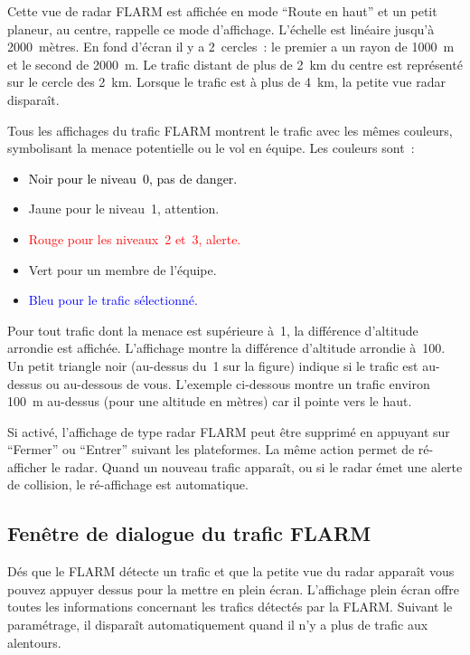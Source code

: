Cette vue de radar FLARM est affichée en mode ``Route en haut'' et un petit planeur, au centre, rappelle ce mode d'affichage. L'échelle est linéaire jusqu'à 2000~mètres. En fond d'écran il y a 2~cercles~: le premier a un rayon de 1000~m et le second de 2000~m. Le trafic distant de plus de 2~km du centre est représenté sur le cercle des 2~km.
Lorsque le trafic est à plus de 4~km, la petite vue radar disparaît.


Tous les affichages du trafic FLARM montrent le trafic avec les mêmes couleurs, symbolisant la menace potentielle ou le vol en équipe. Les couleurs sont~:
\begin{itemize}
\item \textcolor{black} {Noir pour le niveau~0, pas de danger.} 
\item \textcolor{warning} {Jaune pour le niveau~1, attention.}
\item \textcolor{red} {Rouge pour les niveaux~2 et~3, alerte.}
\item \textcolor{teammate} {Vert pour un membre de l'équipe.}
\item \textcolor{blue} {Bleu pour le trafic sélectionné.}
\end{itemize}

Pour tout trafic dont la menace est supérieure à~1, la différence d'altitude arrondie est affichée. L'affichage montre la différence d'altitude arrondie à~100. Un petit triangle noir (au-dessus du~1 sur la figure) indique si le trafic est au-dessus ou au-dessous de vous. L'exemple ci-dessous montre un trafic environ 100~m au-dessus (pour une altitude en mètres) car il pointe vers le haut. 

Si activé, l'affichage de type radar FLARM peut être supprimé en appuyant sur ``Fermer'' ou ``Entrer'' suivant les plateformes.
La même action permet de ré-afficher le radar. Quand un nouveau trafic apparaît, ou si le radar émet une alerte de collision, le ré-affichage est automatique.

\subsection*{Fenêtre de dialogue du trafic FLARM}\label{sec:flarm-traffic}

Dés que le FLARM détecte un trafic et que la petite vue du radar apparaît vous pouvez appuyer dessus pour la mettre en plein écran.
L'affichage plein écran offre toutes les informations
concernant les trafics détectés par la FLARM. Suivant le paramétrage, il disparaît automatiquement quand il n'y a plus de trafic aux alentours.

